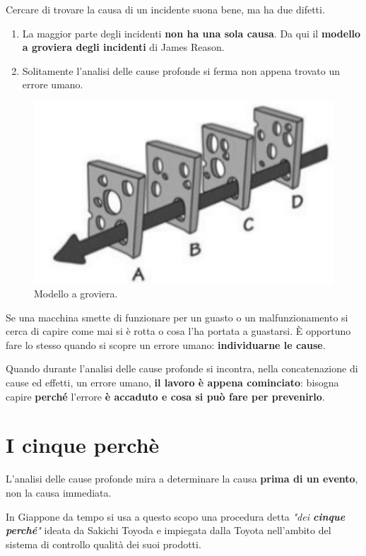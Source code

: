 Cercare di trovare la causa di un incidente suona bene, ma ha due difetti.

\begin{enumerate}
	\item La maggior parte degli incidenti \textbf{non ha una sola causa}. Da qui il \textbf{modello a groviera degli incidenti} di James Reason.
	\item Solitamente l'analisi delle cause profonde si ferma non appena trovato un errore umano.
\end{enumerate}

\pagebreak

\begin{figure}[!h]
	\centering
	\includegraphics[scale=0.55]{immagini/Groviera.png}
	\caption{Modello a groviera.}
\end{figure}

Se una macchina smette di funzionare per un guasto o un malfunzionamento
si cerca di capire come mai si è rotta o cosa l'ha portata a guastarsi. È
opportuno fare lo stesso quando si scopre un errore umano: \textbf{individuarne le cause}.

Quando durante l'analisi delle cause profonde si incontra, nella concatenazione di cause ed effetti, un errore umano, \textbf{il lavoro è appena cominciato}: bisogna capire \textbf{perché} l'errore \textbf{è accaduto e cosa si può fare per prevenirlo}.

\section{I cinque perchè}

L'analisi delle cause profonde mira a determinare la causa \textbf{prima di un evento}, non la causa immediata.

In Giappone da tempo si usa a questo scopo una procedura detta \textit{"dei \textbf{cinque perché}"} ideata da Sakichi Toyoda e impiegata dalla Toyota nell'ambito del sistema di controllo qualità dei suoi prodotti.

